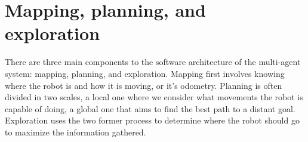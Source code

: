 \documentclass[12pt]{article}
\begin{document}
        \begin{table}[]
            \centering
            \mbox{}
            \label{tab:patched_instructions}    
            \caption{Patched instructions for version check}
        \end{table}




    \newpage

\section{Mapping, planning, and exploration}

    There are three main components to the software architecture of the multi-agent system: mapping, planning, and exploration. Mapping first involves knowing where the robot is and how it is moving, or it's odometry. Planning is often divided in two scales, a local one where we consider what movements the robot is capable of doing, a global one that aims to find the best path to a distant goal. Exploration uses the two former process to determine where the robot should go to maximize the information gathered.
\end{document}
